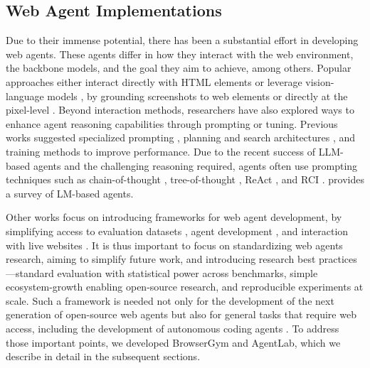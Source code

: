 \documentclass[10pt]{article} %
\begin{document}
\subsection{Web Agent Implementations}

Due to their immense potential, there has been a substantial effort in developing web agents. These agents differ in how they interact with the web environment, the backbone models, and the goal they aim to achieve, among others.
Popular approaches either interact directly with HTML elements \citep{webgpt, mind2web, gur-etal-2023-understanding, web-agent-gur} or 
leverage vision-language models \citep{liu2023visual, gpt-4, claude, llama3}, by grounding screenshots to web elements \citep{web-voyager, furuta2024multimodal, seeact, visual-webarena, dualvcr} or directly at the pixel-level \citep{pix2act, seeclick, seeact-v}. Beyond interaction methods, researchers have also explored ways to enhance agent reasoning capabilities through prompting or tuning. 
Previous works suggested specialized prompting \citep{hierarchical-prompts, zheng2024synapsetrajectoryasexemplarpromptingmemory, sarch2024vlmagentsgeneratememories, chi2024impactelementorderinglm}, planning and search architectures \citep{lats, assistant-bench, web-pilot, gu2024webdreamer, koh2024treesearch}, and training methods \citep{gur2018learning,webgpt, pmlr-v162-humphreys22a, webvln, agent-q, step-agent} to improve performance.
Due to the recent success of LLM-based agents and the challenging reasoning required, agents often use prompting techniques such as chain-of-thought \citep{chain-of-thought}, tree-of-thought \citep{tree-of-thoughts}, ReAct \citep{yao2022react}, and RCI \citep{rci-agent}. \citet{wang2024survey} provides a survey of LM-based agents.

Other works focus on introducing frameworks for web agent development, by simplifying access to evaluation datasets \citep{huggingfacedatasets, AISI_inspect, ma2024agentboar}, agent development \citep{open-agents}, and interaction with live websites \citep{webcanvas, zheng-etal-2024-webolympus}.
It is thus important to focus on standardizing web agents research, aiming to simplify future work, and introducing research best practices---standard evaluation with statistical power across benchmarks, simple ecosystem-growth enabling open-source research, and reproducible experiments at scale. Such a framework is needed not only for the development of the next generation of open-source web agents but also for general tasks that require web access, including the development of autonomous coding agents \citep{wang2024openhandsopenplatformai}. 
To address those important points, we developed BrowserGym and AgentLab, which we describe in detail in the subsequent sections. 
\end{document}
